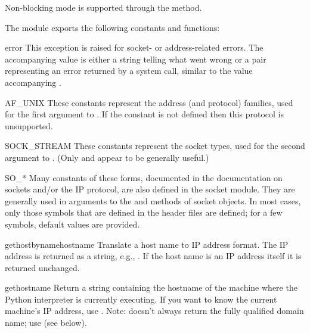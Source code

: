 Non-blocking mode is supported through the 
method.

The module  exports the following constants and functions:

\renewcommand{\indexsubitem}{(in module socket)}
\begin{excdesc}{error}
This exception is raised for socket- or address-related errors.
The accompanying value is either a string telling what went wrong or a
pair 
representing an error returned by a system
call, similar to the value accompanying .
\end{excdesc}

\begin{datadesc}{AF_UNIX}
These constants represent the address (and protocol) families,
used for the first argument to .  If the 
constant is not defined then this protocol is unsupported.
\end{datadesc}

\begin{datadesc}{SOCK_STREAM}
These constants represent the socket types,
used for the second argument to .
(Only  and
 appear to be generally useful.)
\end{datadesc}

\begin{datadesc}{SO_*}
Many constants of these forms, documented in the \UNIX{} documentation on
sockets and/or the IP protocol, are also defined in the socket module.
They are generally used in arguments to the  and
 methods of socket objects.  In most cases, only
those symbols that are defined in the \UNIX{} header files are defined;
for a few symbols, default values are provided.
\end{datadesc}

\begin{funcdesc}{gethostbyname}{hostname}
Translate a host name to IP address format.  The IP address is
returned as a string, e.g.,  .  If the host name
is an IP address itself it is returned unchanged.
\end{funcdesc}

\begin{funcdesc}{gethostname}{}
Return a string containing the hostname of the machine where 
the Python interpreter is currently executing.  If you want to know the
current machine's IP address, use
.
Note:  doesn't always return the fully qualified
domain name; use 
(see below).
\end{funcdesc}


